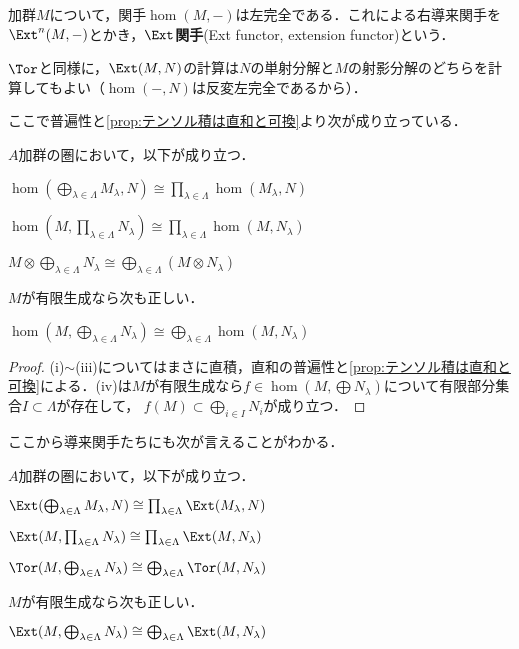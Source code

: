 \begin{defi}[$\Ext$関手]
	加群$M$について，関手$\hom(M,-)$は左完全である．これによる右導来関手を$\Ext^n(M,-)$とかき，$\Ext$\textbf{関手}(Ext functor, extension functor)という．
\end{defi}

$\Tor$と同様に，$\Ext(M,N)$の計算は$N$の単射分解と$M$の射影分解のどちらを計算してもよい（$\hom(-,N)$は反変左完全であるから）．

ここで普遍性と\ref{prop:テンソル積は直和と可換}より次が成り立っている．

\begin{prop}
	$A$加群の圏において，以下が成り立つ．
	\begin{sakura}
		\item $\hom(\bigoplus_{\lambda\in\Lambda} M_\lambda,N)\cong\prod_{\lambda\in\Lambda}\hom(M_\lambda,N)$
		\item $\hom(M,\prod_{\lambda\in\Lambda}N_\lambda)\cong\prod_{\lambda\in\Lambda}\hom(M,N_\lambda)$
		\item $M\otimes\bigoplus_{\lambda\in\Lambda}N_\lambda\cong\bigoplus_{\lambda\in\Lambda}(M\otimes N_\lambda)$
	\end{sakura}
	$M$が有限生成なら次も正しい．
	\begin{sakura}\setcounter{enumi}{3}
		\item $\hom(M,\bigoplus_{\lambda\in\Lambda}N_\lambda)\cong\bigoplus_{\lambda\in\Lambda}\hom(M,N_\lambda)$
	\end{sakura}
\end{prop}

\begin{proof}
	(i)$\sim$(iii)についてはまさに直積，直和の普遍性と\ref{prop:テンソル積は直和と可換}による．(iv)は$M$が有限生成なら$f\in\hom(M,\bigoplus N_\lambda)$について有限部分集合$I\subset\Lambda$が存在して， $f(M)\subset\bigoplus_{i\in I} N_i$が成り立つ．
\end{proof}

ここから導来関手たちにも次が言えることがわかる．

\begin{prop}
	$A$加群の圏において，以下が成り立つ．
	\begin{sakura}
		\item $\Ext(\bigoplus_{\lambda\in\Lambda} M_\lambda,N)\cong\prod_{\lambda\in\Lambda}\Ext(M_\lambda,N)$
		\item $\Ext(M,\prod_{\lambda\in\Lambda}N_\lambda)\cong\prod_{\lambda\in\Lambda}\Ext(M,N_\lambda)$
		\item $\Tor(M,\bigoplus_{\lambda\in\Lambda}N_\lambda)\cong\bigoplus_{\lambda\in\Lambda}\Tor(M,N_\lambda)$
	\end{sakura}
	$M$が有限生成なら次も正しい．
	\begin{sakura}\setcounter{enumi}{3}
		\item $\Ext(M,\bigoplus_{\lambda\in\Lambda}N_\lambda)\cong\bigoplus_{\lambda\in\Lambda}\Ext(M,N_\lambda)$
	\end{sakura}
\end{prop}

